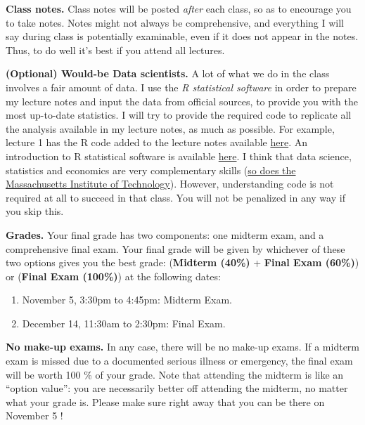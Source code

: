 \documentclass[]{book}
\providecommand{\tightlist}{%
  \setlength{\itemsep}{0pt}\setlength{\parskip}{0pt}}
\theoremstyle{definition}
\theoremstyle{definition}
\theoremstyle{definition}
\theoremstyle{remark}
\begin{document}
\textbf{Class notes.} Class notes will be posted \emph{after} each
class, so as to encourage you to take notes. Notes might not always be
comprehensive, and everything I will say during class is potentially
examinable, even if it does not appear in the notes. Thus, to do well
it's best if you attend all lectures.

\textbf{(Optional) Would-be Data scientists.} A lot of what we do in the
class involves a fair amount of data. I use the \emph{R statistical
software} in order to prepare my lecture notes and input the data from
official sources, to provide you with the most up-to-date statistics. I
will try to provide the required code to replicate all the analysis
available in my lecture notes, as much as possible. For example, lecture
1 has the R code added to the lecture notes available
\href{https://fgeerolf.github.io/teaching/ECON102/lecture1-R.pdf}{here}.
An introduction to R statistical software is available
\href{https://fgeerolf.github.io/teaching/ECON102/R-intro.pdf}{here}. I
think that data science, statistics and economics are very complementary
skills
(\href{https://www.eecs.mit.edu/academics-admissions/undergraduate-programs/6-14-computer-science-economics-and-data-science}{so
does the Massachusetts Institute of Technology}). However, understanding
code is not required at all to succeed in that class. You will not be
penalized in any way if you skip this.

\textbf{Grades.} Your final grade has two components: one midterm exam,
and a comprehensive final exam. Your final grade will be given by
whichever of these two options gives you the best grade:
(\textbf{Midterm (40\%)} + \textbf{Final Exam (60\%)}) or (\textbf{Final
Exam (100\%)}) at the following dates:

\begin{enumerate}
\def\labelenumi{\arabic{enumi}.}
\tightlist
\item
  November 5, 3:30pm to 4:45pm: Midterm Exam.
\item
  December 14, 11:30am to 2:30pm: Final Exam.
\end{enumerate}

\textbf{No make-up exams.} In any case, there will be no make-up exams.
If a midterm exam is missed due to a documented serious illness or
emergency, the final exam will be worth 100 \% of your grade. Note that
attending the midterm is like an ``option value'': you are necessarily
better off attending the midterm, no matter what your grade is. Please
make sure right away that you can be there on November 5 !
\end{document}
